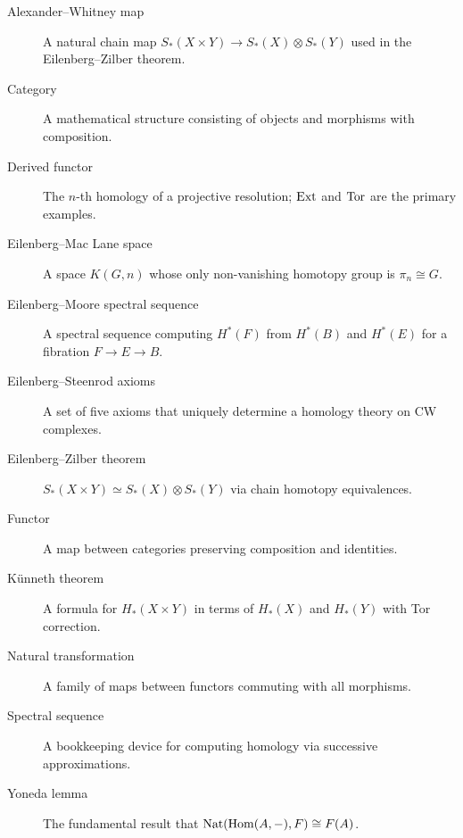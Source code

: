 \begin{description}
    \item[Alexander--Whitney map] A natural chain map $S_*(X \times Y) \to S_*(X) \otimes S_*(Y)$ used in the Eilenberg--Zilber theorem.
    \item[Category] A mathematical structure consisting of objects and morphisms with composition.
    \item[Derived functor] The $n$-th homology of a projective resolution; $\operatorname{Ext}$ and $\operatorname{Tor}$ are the primary examples.
    \item[Eilenberg--Mac Lane space] A space $K(G,n)$ whose only non-vanishing homotopy group is $\pi_n \cong G$.
    \item[Eilenberg--Moore spectral sequence] A spectral sequence computing $H^*(F)$ from $H^*(B)$ and $H^*(E)$ for a fibration $F \to E \to B$.
    \item[Eilenberg--Steenrod axioms] A set of five axioms that uniquely determine a homology theory on CW complexes.
    \item[Eilenberg--Zilber theorem] $S_*(X \times Y) \simeq S_*(X) \otimes S_*(Y)$ via chain homotopy equivalences.
    \item[Functor] A map between categories preserving composition and identities.
    \item[K\"unneth theorem] A formula for $H_*(X \times Y)$ in terms of $H_*(X)$ and $H_*(Y)$ with Tor correction.
    \item[Natural transformation] A family of maps between functors commuting with all morphisms.
    \item[Spectral sequence] A bookkeeping device for computing homology via successive approximations.
    \item[Yoneda lemma] The fundamental result that $\operatorname{Nat}(\operatorname{Hom}(A,-), F) \cong F(A)$.
\end{description}

